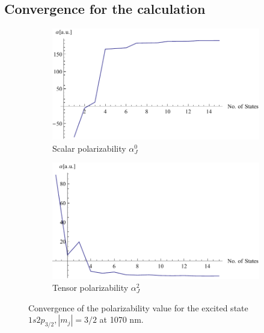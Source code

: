 \subsection{Convergence for the calculation}

\begin{figure}[H]
\centering
\begin{subfigure}[b]{0.4\textwidth}
                \includegraphics[width=\textwidth]{alphascalarconvexcited}
                \caption{Scalar polarizability $\alpha^0_J$}
\end{subfigure}
\begin{subfigure}[b]{0.4\textwidth}
               \includegraphics[width=\textwidth]{alphatensorconvexcited}
                \caption{Tensor polarizability $\alpha^2_J$}
\end{subfigure}


\caption{Convergence of the polarizability value for the excited state $1s2p_{3/2}, |m_j|=3/2$ at 1070 nm.}
\label{alphaconv}
\end{figure}

